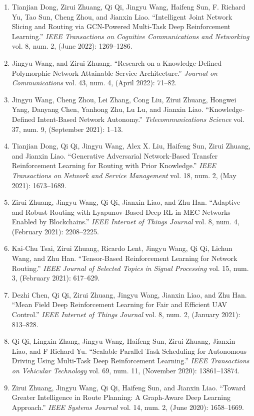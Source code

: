 \documentclass[letterpaper,11pt]{article}
\newcommand{\contentlength}{5.5in}
\begin{document}
\begin{tcolorbox}[flush right,breakable,colback=white,colframe=white,width=\contentlength]
\begin{enumerate}[itemsep=0mm]
			\item Tianjian Dong, Zirui Zhuang, Qi Qi, Jingyu Wang, Haifeng Sun, F. Richard Yu, Tao Sun, Cheng Zhou, and Jianxin Liao. “Intelligent Joint Network Slicing and Routing via GCN-Powered Multi-Task Deep Reinforcement Learning.” \textit{IEEE Transactions on Cognitive Communications and Networking} vol. 8, num. 2, (June 2022): 1269–1286.
			\item Jingyu Wang, and Zirui Zhuang. “Research on a Knowledge-Defined Polymorphic Network Attainable Service Architecture.” \textit{Journal on Communications} vol. 43, num. 4, (April 2022): 71–82.
			\item Jingyu Wang, Cheng Zhou, Lei Zhang, Cong Liu, Zirui Zhuang, Hongwei Yang, Danyang Chen, Yanhong Zhu, Lu Lu, and Jianxin Liao. “Knowledge-Defined Intent-Based Network Autonomy.” \textit{Telecommunications Science} vol. 37, num. 9, (September 2021): 1–13.
			\item Tianjian Dong, Qi Qi, Jingyu Wang, Alex X. Liu, Haifeng Sun, Zirui Zhuang, and Jianxin Liao. “Generative Adversarial Network-Based Transfer Reinforcement Learning for Routing with Prior Knowledge.” \textit{IEEE Transactions on Network and Service Management} vol. 18, num. 2, (May 2021): 1673–1689.
			\item Zirui Zhuang, Jingyu Wang, Qi Qi, Jianxin Liao, and Zhu Han. “Adaptive and Robust Routing with Lyapunov-Based Deep RL in MEC Networks Enabled by Blockchains.” \textit{IEEE Internet of Things Journal} vol. 8, num. 4, (February 2021): 2208–2225.
			\item Kai-Chu Tsai, Zirui Zhuang, Ricardo Lent, Jingyu Wang, Qi Qi, Lichun Wang, and Zhu Han. “Tensor-Based Reinforcement Learning for Network Routing.” \textit{IEEE Journal of Selected Topics in Signal Processing} vol. 15, num. 3, (February 2021): 617–629.
			\item Dezhi Chen, Qi Qi, Zirui Zhuang, Jingyu Wang, Jianxin Liao, and Zhu Han. “Mean Field Deep Reinforcement Learning for Fair and Efficient UAV Control.” \textit{IEEE Internet of Things Journal} vol. 8, num. 2, (January 2021): 813–828.
			\item Qi Qi, Lingxin Zhang, Jingyu Wang, Haifeng Sun, Zirui Zhuang, Jianxin Liao, and F Richard Yu. “Scalable Parallel Task Scheduling for Autonomous Driving Using Multi-Task Deep Reinforcement Learning.” \textit{IEEE Transactions on Vehicular Technology} vol. 69, num. 11, (November 2020): 13861–13874.
			\item  Zirui Zhuang, Jingyu Wang, Qi Qi, Haifeng Sun, and Jianxin Liao. “Toward Greater Intelligence in Route Planning: A Graph-Aware Deep Learning Approach.” \textit{IEEE Systems Journal} vol. 14, num. 2, (June 2020): 1658–1669.

\end{enumerate}
\end{tcolorbox}
\end{document}
